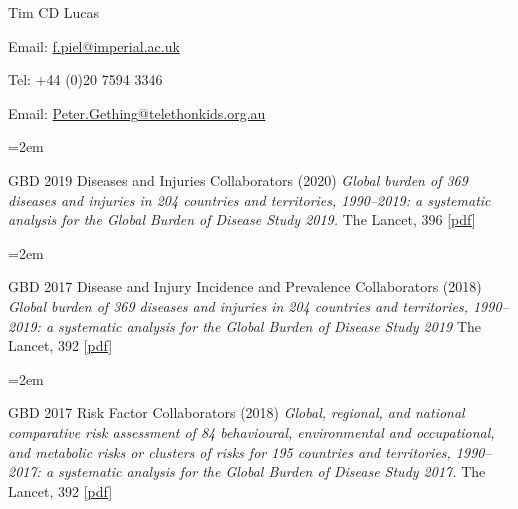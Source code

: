 \documentclass{scrartcl}
\newcommand{\MarginText}[1]{\marginpar{\raggedleft\itshape\small#1}} %
\newcommand{\Description}[1]{\hangindent=2em\hangafter=0\noindent\raggedright\footnotesize{#1}\par\normalsize\vspace{1em}} %
\begin{document}
\begin{cv}{Tim {\Large CD} Lucas}
\begin{multicols}{2}
\begin{footnotesize}
\end{footnotesize}
\end{multicols}
\vspace{-0.5cm}
\begin{multicols}{2}
\begin{footnotesize}

Email: \href{mailto:f.piel@imperial.ac.uk}{f.piel{\scriptsize @}imperial.ac.uk}\newline

Tel: +44 (0)20 7594 3346


\columnbreak
Email: \href{mailto:Peter.Gething@telethonkids.org.au}{Peter.Gething{\scriptsize @}telethonkids.org.au}\newline

\end{footnotesize}
\end{multicols}



\vspace{2em} %


{\color{Maroon}}\vspace{1em}


\Description{\MarginText{2020}GBD 2019 Diseases and Injuries Collaborators (2020) \emph{Global burden of 369 diseases and injuries in 204 countries and territories, 1990–2019: a systematic analysis for the Global Burden of Disease Study 2019.} The Lancet, 396 [\href{https://reader.elsevier.com/reader/sd/pii/S0140673618322256?token=B51BB41EDB592105E398079BFEE0CA91BB2DA80DC879A7B3CFD538DFBF8ADE6FA424858694B94E7860E6AE8461E553E7}{pdf}]}


\Description{GBD 2017 Disease and Injury Incidence and Prevalence Collaborators (2018) \emph{Global burden of 369 diseases and injuries in 204 countries and territories, 1990–2019: a systematic analysis for the Global Burden of Disease Study 2019} The Lancet, 392 [\href{https://www.sciencedirect.com/science/article/pii/S0140673618322797/pdfft?md5=7f77aa9068dc470c4dec82747c586883&pid=1-s2.0-S0140673618322797-main.pdf}{pdf}]}



\Description{\MarginText{2018}GBD 2017 Risk Factor Collaborators (2018) \emph{Global, regional, and national comparative risk assessment of 84 behavioural, environmental and occupational, and metabolic risks or clusters of risks for 195 countries and territories, 1990--2017: a systematic analysis for the Global Burden of Disease Study 2017.} The Lancet, 392 [\href{https://reader.elsevier.com/reader/sd/pii/S0140673618322256?token=B51BB41EDB592105E398079BFEE0CA91BB2DA80DC879A7B3CFD538DFBF8ADE6FA424858694B94E7860E6AE8461E553E7}{pdf}]}


\end{cv}
\end{document}
